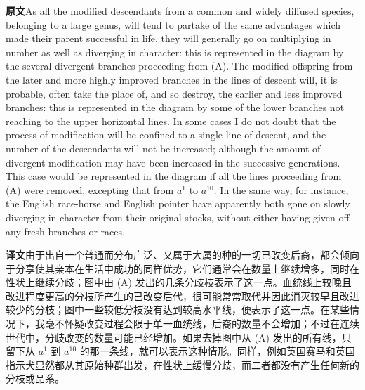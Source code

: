 \documentclass[UTF8,zihao=-4]{ctexart}
\newcommand{\BodyFont}{\fontsize{10.5pt}{15.5pt}\selectfont}
\newcommand{\origlabel}{\textbf{原文}\quad}
\newcommand{\translabel}{\textbf{译文}\quad}
\newenvironment{enblock}{\par\noindent\begingroup\BodyFont\origlabel}{\par\endgroup}
\newenvironment{zhblock}{\par\noindent\begingroup\BodyFont\translabel}{\par\endgroup\vspace{0.35em}}
\newcommand{\pair}[2]{\begin{enblock}#1\end{enblock}\begin{zhblock}#2\end{zhblock}}
\begin{document}
\pair{As all the modified descendants from a common and widely diffused species, belonging to a large genus, will tend to partake of the same advantages which made their parent successful in life, they will generally go on multiplying in number as well as diverging in character: this is represented in the diagram by the several divergent branches proceeding from (A). The modified offspring from the later and more highly improved branches in the lines of descent will, it is probable, often take the place of, and so destroy, the earlier and less improved branches: this is represented in the diagram by some of the lower branches not reaching to the upper horizontal lines. In some cases I do not doubt that the process of modification will be confined to a single line of descent, and the number of the descendants will not be increased; although the amount of divergent modification may have been increased in the successive generations. This case would be represented in the diagram if all the lines proceeding from (A) were removed, excepting that from $a^{1}$ to $a^{10}$. In the same way, for instance, the English race-horse and English pointer have apparently both gone on slowly diverging in character from their original stocks, without either having given off any fresh branches or races.}{由于出自一个普通而分布广泛、又属于大属的种的一切已改变后裔，都会倾向于分享使其亲本在生活中成功的同样优势，它们通常会在数量上继续增多，同时在性状上继续分歧；图中由 (A) 发出的几条分歧枝表示了这一点。血统线上较晚且改进程度更高的分枝所产生的已改变后代，很可能常常取代并因此消灭较早且改进较少的分枝；图中一些较低分枝没有达到较高水平线，便表示了这一点。在某些情况下，我毫不怀疑改变过程会限于单一血统线，后裔的数量不会增加；不过在连续世代中，分歧改变的数量可能已经增加。如果去掉图中从 (A) 发出的所有线，只留下从 $a^{1}$ 到 $a^{10}$ 的那一条线，就可以表示这种情形。同样，例如英国赛马和英国指示犬显然都从其原始种群出发，在性状上缓慢分歧，而二者都没有产生任何新的分枝或品系。}
\end{document}
